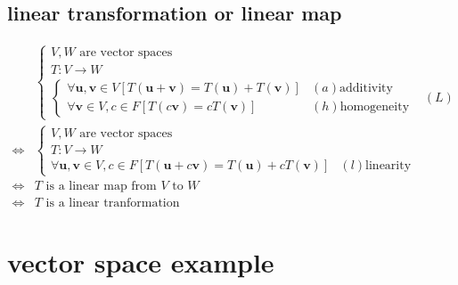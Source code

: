 \documentclass[
]{book}
\theoremstyle{definition}
\theoremstyle{definition}
\theoremstyle{definition}
\theoremstyle{definition}
\theoremstyle{remark}
\begin{document}
\subsection{linear transformation or linear map}\label{linear-transformation-or-linear-map}

\[
\begin{aligned}
 & \begin{cases}
V,W\text{ are vector spaces}\\
T:V\rightarrow W\\
\begin{cases}
\forall\boldsymbol{u},\boldsymbol{v}\in V\left[T\left(\boldsymbol{u}+\boldsymbol{v}\right)=T\left(\boldsymbol{u}\right)+T\left(\boldsymbol{v}\right)\right] & \left(a\right)\text{additivity}\\
\forall\boldsymbol{v}\in V,c\in F\left[T\left(c\boldsymbol{v}\right)=cT\left(\boldsymbol{v}\right)\right] & \left(h\right)\text{homogeneity}
\end{cases} & \left(L\right)
\end{cases}\\
\Leftrightarrow & \begin{cases}
V,W\text{ are vector spaces}\\
T:V\rightarrow W\\
\forall\boldsymbol{u},\boldsymbol{v}\in V,c\in F\left[T\left(\boldsymbol{u}+c\boldsymbol{v}\right)=T\left(\boldsymbol{u}\right)+cT\left(\boldsymbol{v}\right)\right] & \left(l\right)\text{linearity}
\end{cases}\\
\Leftrightarrow & T\text{ is a linear map from }V\text{ to }W\\
\Leftrightarrow & T\text{ is a linear tranformation}
\end{aligned}
\]

\section{vector space example}\label{vector-space-example}
\end{document}
